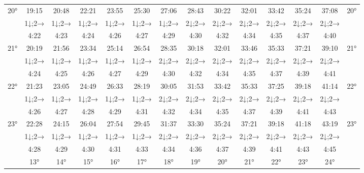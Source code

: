 \begin{scriptsize}
\begin{tabular}{c || c | c | c | c | c | c | c | c | c | c | c | c || c}
		\multirow{3}{*}{20°}&19:15&20:48&22:21&23:55&25:30&27:06&28:43&30:22&32:01&33:42&35:24&37:08&\multirow{3}{*}{20°}\\ \space&1↓;2→&1↓;2→&1↓;2→&1↓;2→&1↓;2→&1↓;2→&2↓;2→&2↓;2→&2↓;2→&2↓;2→&2↓;2→&2↓;2→&\space\\&4:22&4:23&4:24&4:26&4:27&4:29&4:30&4:32&4:34&4:35&4:37&4:40&\space\\\hline
		\multirow{3}{*}{21°}&20:19&21:56&23:34&25:14&26:54&28:35&30:18&32:01&33:46&35:33&37:21&39:10&\multirow{3}{*}{21°}\\ \space&1↓;2→&1↓;2→&1↓;2→&1↓;2→&1↓;2→&2↓;2→&2↓;2→&2↓;2→&2↓;2→&2↓;2→&2↓;2→&2↓;2→&\space\\&4:24&4:25&4:26&4:27&4:29&4:30&4:32&4:34&4:35&4:37&4:39&4:41&\space\\\hline
		\multirow{3}{*}{22°}&21:23&23:05&24:49&26:33&28:19&30:05&31:53&33:42&35:33&37:25&39:18&41:14&\multirow{3}{*}{22°}\\ \space&1↓;2→&1↓;2→&1↓;2→&1↓;2→&1↓;2→&2↓;2→&2↓;2→&2↓;2→&2↓;2→&2↓;2→&2↓;2→&2↓;2→&\space\\&4:26&4:27&4:28&4:29&4:31&4:32&4:34&4:35&4:37&4:39&4:41&4:43&\space\\\hline
		\multirow{3}{*}{23°}&22:28&24:15&26:04&27:54&29:45&31:37&33:30&35:24&37:21&39:18&41:18&43:19&\multirow{3}{*}{23°}\\ \space&1↓;2→&1↓;2→&1↓;2→&1↓;2→&1↓;2→&2↓;2→&2↓;2→&2↓;2→&2↓;2→&2↓;2→&2↓;2→&2↓;2→&\space\\&4:28&4:29&4:30&4:31&4:33&4:34&4:36&4:37&4:39&4:41&4:43&4:45&\space\\\hline
		\hline\space &13°&14°&15°&16°&17°&18°&19°&20°&21°&22°&23°&24°
\end{tabular}\end{scriptsize}

